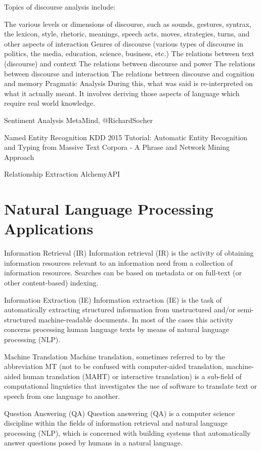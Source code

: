 Topics of discourse analysis include:

The various levels or dimensions of discourse, such as sounds, gestures, syntrax, the lexicon, style, rhetoric, meanings, speech acts, moves, strategies, turns, and other aspects of interaction
Genres of discourse (various types of discourse in politics, the media, education, science, business, etc.)
The relations between text (discourse) and context
The relations between discourse and power
The relations between discourse and interaction
The relations between discourse and cognition and memory
Pragmatic Analysis
During this, what was said is re-interpreted on what it actually meant. It involves deriving those aspects of language which require real world knowledge.

Sentiment Analysis
MetaMind, @RichardSocher

Named Entity Recognition
KDD 2015 Tutorial: Automatic Entity Recognition and Typing from Massive Text Corpora - A Phrase and Network Mining Approach

Relationship Extraction
AlchemyAPI

\section{Natural Language Processing Applications}

Information Retrieval (IR)
Information retrieval (IR) is the activity of obtaining information resources relevant to an information need from a collection of information resources. Searches can be based on metadata or on full-text (or other content-based) indexing.

Information Extraction (IE)
Information extraction (IE) is the task of automatically extracting structured information from unstructured and/or semi-structured machine-readable documents. In most of the cases this activity concerns processing human language texts by means of natural language processing (NLP).

Machine Translation
Machine translation, sometimes referred to by the abbreviation MT (not to be confused with computer-aided translation, machine-aided human translation (MAHT) or interactive translation) is a sub-field of computational linguistics that investigates the use of software to translate text or speech from one language to another.

Question Answering (QA)
Question answering (QA) is a computer science discipline within the fields of information retrieval and natural language processing (NLP), which is concerned with building systems that automatically answer questions posed by humans in a natural language.

